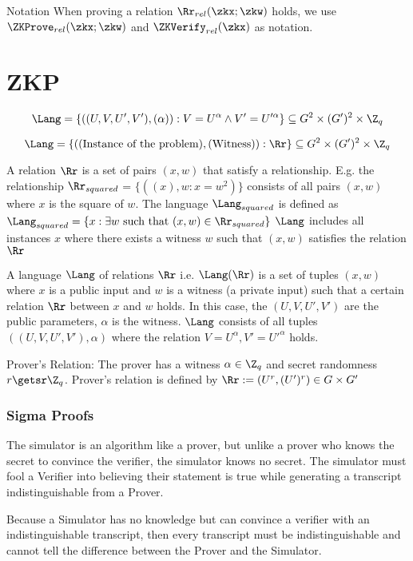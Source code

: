 Notation
When proving a relation $\Rr_{rel}(\zkx; \zkw)$ holds, we use $\ZKProve_{rel}(\zkx; \zkw)$ and $\ZKVerify_{rel}(\zkx)$ as notation.

\section{ZKP}
\[\Lang = \left\{((U, V, U', V'),(\alpha)) : V = U^{\alpha} \wedge V' = U'^{\alpha} \right\} \subseteq G^2 \times (G')^2 \times \Z_q\]

\[\Lang = \left\{((\text{Instance of the problem}),(\text{Witness})) : \Rr \right\} \subseteq G^2 \times (G')^2 \times \Z_q\]

\noindent A relation $\Rr$ is a set of pairs $(x,w)$ that satisfy a relationship. E.g. the relationship $\Rr_{squared}$ = $\{((x),w : x=w^2)\}$ consists of all pairs $(x,w)$ where $x$ is the square of $w$. The language $\Lang_{squared}$ is defined as $\Lang_{squared} = \{x  : \exists w \text{ such that }(x,w) \in \Rr_{squared} \}$
$\Lang$ includes all instances $x$ where there exists a witness $w$ such that $(x,w)$ satisfies the relation $\Rr$


\noindent A language $\Lang$ of relations $\Rr$ i.e. $\Lang(\Rr)$ is a set of tuples $(x,w)$ where $x$ is a public input and $w$ is a witness (a private input) such that a certain relation $\Rr$ between $x$ and $w$ holds. In this case, the $(U, V, U', V')$ are the public parameters, $\alpha$ is the witness. $\Lang$ consists of all tuples $((U, V, U', V'),\alpha)$ where the relation $V = U^{\alpha}, V'=U'^{\alpha}$ holds.

\noindent Prover's Relation: The prover has a witness $\alpha \in \Z_q$ and secret randomness $r \getsr \Z_q$. Prover's relation is defined by $\Rr := (U^r, (U')^r) \in G \times G' $ 

\subsubsection{Sigma Proofs}

The simulator is an algorithm like a prover, but unlike a prover who knows the secret to convince the verifier, the simulator knows no secret. The simulator must fool a Verifier into believing their statement is true while generating a transcript indistinguishable from a Prover.

Because a Simulator has no knowledge but can convince a verifier with an indistinguishable transcript, then every transcript must be indistinguishable and cannot tell the difference between the Prover and the Simulator.

